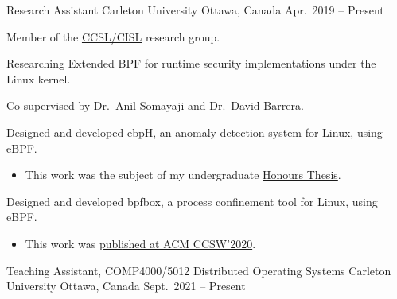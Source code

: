 

\begin{cventries}

  \cventry
    {Research Assistant} %
    {Carleton University} %
    {Ottawa, Canada} %
    {Apr.~2019 -- Present} %
    {
      \begin{cvitems} %
        \item Member of the \href{https://www.cisl.carleton.ca/}{CCSL/CISL} research group.
        \item Researching Extended BPF for runtime security implementations under the Linux kernel.
        \item Co-supervised by \href{https://people.scs.carleton.ca/~soma/}{Dr.~Anil Somayaji}
          and \href{https://dbarrera.xyz/}{Dr.~David Barrera}.
        \item Designed and developed ebpH, an anomaly detection system for Linux, using eBPF.
        \begin{itemize}
          \item This work was the subject of my undergraduate
            \href{https://www.cisl.carleton.ca/~will/written/coursework/undergrad-ebpH-thesis.pdf}
              {Honours Thesis}.
        \end{itemize}
        \item Designed and developed bpfbox, a process confinement tool for Linux, using eBPF.
        \begin{itemize}
          \item This work was \href{https://dl.acm.org/doi/10.1145/3411495.3421358}{published at ACM CCSW'2020}.
        \end{itemize}
      \end{cvitems}
    }
  \cventry
    {Teaching Assistant, COMP4000/5012 Distributed Operating Systems} %
    {Carleton University} %
    {Ottawa, Canada} %
    {Sept.\ 2021 -- Present} %
    {
      \begin{cvitems} %

\end{cvitems}}
\end{cventries}

